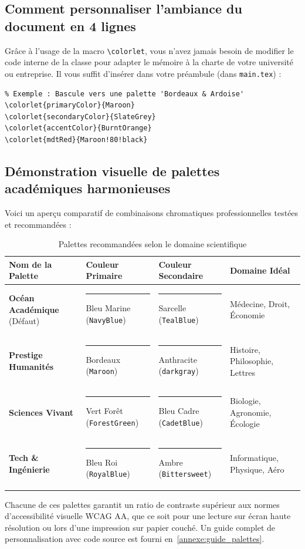 \subsection{Comment personnaliser l'ambiance du document en 4 lignes}
\label{subsec:personnalisation_couleurs}

Grâce à l'usage de la macro \texttt{\textbackslash colorlet}, vous n'avez jamais besoin de modifier le code interne de la classe pour adapter le mémoire à la charte de votre université ou entreprise.
Il vous suffit d'insérer dans votre préambule (dans \texttt{main.tex}) :

\begin{verbatim}
% Exemple : Bascule vers une palette 'Bordeaux & Ardoise'
\colorlet{primaryColor}{Maroon}
\colorlet{secondaryColor}{SlateGrey}
\colorlet{accentColor}{BurntOrange}
\colorlet{mdtRed}{Maroon!80!black}
\end{verbatim}

\subsection{Démonstration visuelle de palettes académiques harmonieuses}
\label{subsec:nuanciers_harmonieux}

Voici un aperçu comparatif de combinaisons chromatiques professionnelles testées et recommandées :

\begin{table}[htbp]
  \centering
  \small
  \caption{Palettes recommandées selon le domaine scientifique}
  \label{tab:palettes_recommandees}
  \begin{tabularx}{\textwidth}{l L{3.5cm} L{4cm} Y}
    \toprule
    \textbf{Nom de la Palette} & \textbf{Couleur Primaire} & \textbf{Couleur Secondaire} & \textbf{Domaine Idéal} \\
    \midrule
    \textbf{Océan Académique} (Défaut) & \textcolor{NavyBlue}{\rule{6pt}{6pt}} Bleu Marine (\texttt{NavyBlue}) & \textcolor{TealBlue}{\rule{6pt}{6pt}} Sarcelle (\texttt{TealBlue}) & Médecine, Droit, Économie \\
    \textbf{Prestige Humanités} & \textcolor{Maroon}{\rule{6pt}{6pt}} Bordeaux (\texttt{Maroon}) & \textcolor{darkgray}{\rule{6pt}{6pt}} Anthracite (\texttt{darkgray}) & Histoire, Philosophie, Lettres \\
    \textbf{Sciences Vivant} & \textcolor{ForestGreen}{\rule{6pt}{6pt}} Vert Forêt (\texttt{ForestGreen}) & \textcolor{CadetBlue}{\rule{6pt}{6pt}} Bleu Cadre (\texttt{CadetBlue}) & Biologie, Agronomie, Écologie \\
    \textbf{Tech \& Ingénierie} & \textcolor{RoyalBlue}{\rule{6pt}{6pt}} Bleu Roi (\texttt{RoyalBlue}) & \textcolor{Bittersweet}{\rule{6pt}{6pt}} Ambre (\texttt{Bittersweet}) & Informatique, Physique, Aéro \\
    \bottomrule
  \end{tabularx}
\end{table}

Chacune de ces palettes garantit un ratio de contraste supérieur aux normes d'accessibilité visuelle WCAG AA, que ce soit pour une lecture sur écran haute résolution ou lors d'une impression sur papier couché.
Un guide complet de personnalisation avec code source est fourni en~\cref{annexe:guide_palettes}.

